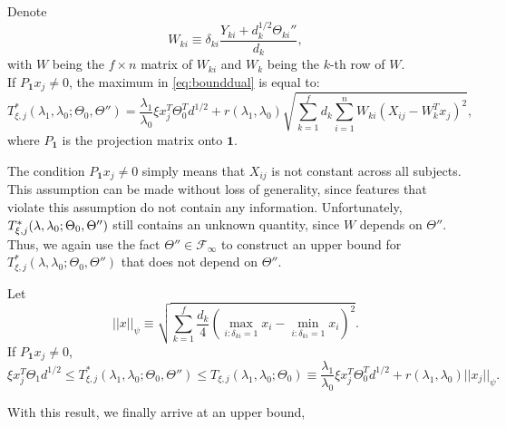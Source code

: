\begin{lemma}
    \label{lem:3}
    Denote
    \begin{equation}
        \label{eq:w}
        W_{ki}\equiv\delta_{ki}\frac{Y_{ki}+d_k^{1/2}\Theta_{ki}''}{d_k},
    \end{equation}
    with $W$ being the $f\times n$ matrix of $W_{ki}$ and $W_k$ being the $k$-th row of $W$.\\
    If $P_{\mathbf{1}}x_j\neq 0$, the maximum in \eqref{eq:bounddual} is equal to:
    \begin{equation}
        \label{eq:tstar}
        T^*_{\xi,j}(\lambda_1,\lambda_0;\Theta_{0},\Theta'')=\frac{\lambda_1}{\lambda_0}\xi x_j^T\Theta_{0}^Td^{1/2}+r(\lambda_1,\lambda_0)\sqrt{\sum_{k=1}^fd_k\sum_{i=1}^nW_{ki}\left(X_{ij}-W_k^Tx_j\right)^2},
    \end{equation}
    where $P_{\mathbf{1}}$ is the projection matrix onto $\mathbf{1}$.
\end{lemma}

The condition $P_{\mathbf{1}}x_j \ne 0$ simply means that $X_{ij}$ is not constant across all subjects. This assumption can be made without loss of generality, since features that violate this assumption do not contain any information. Unfortunately, $\\T^*_{\xi,j}(\lambda,\lambda_0;\Theta_{0},\Theta'')$ still contains an unknown quantity, since $W$ depends on $\Theta''$. Thus, we again use the fact $\Theta''\in\mathcal{F}_\infty$ to construct an upper bound for $T^*_{\xi,j}(\lambda,\lambda_0;\Theta_{0},\Theta'')$ that does not depend on $\Theta''$.

\begin{theorem}
    \label{thm:2}
    Let
    \begin{equation}
        \label{eq:prod}
        ||x||_\psi\equiv\sqrt{\sum_{k=1}^f\frac{d_k}{4}\left(\max_{i:\delta_{ki}=1}x_i-\min_{i:\delta_{ki}=1}x_i\right)^2}.
    \end{equation}
    If $P_{\mathbf{1}}x_j\neq 0$,
    \begin{equation}
        \label{eq:gbbar}
        \xi x_j^T\Theta_{1}d^{1/2}\leq T^*_{\xi,j}(\lambda_1,\lambda_0;\Theta_{0},\Theta'')\leq T_{\xi,j}(\lambda_1,\lambda_0;\Theta_{0})\equiv\frac{\lambda_1}{\lambda_0}\xi x_j^T\Theta_{0}^Td^{1/2}+r(\lambda_1,\lambda_0)||x_j||_\psi.
    \end{equation}
\end{theorem}

With this result, we finally arrive at an upper bound,

